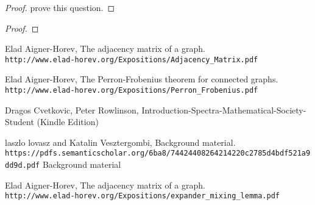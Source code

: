 \documentclass[a4paper, 11pt, oneside]{article}
\newenvironment{problem}[1]
  {\renewcommand\theinnercustomprob{#1}\innercustomprob}
  {\endinnercustomprob}
\begin{document}
\begin{proof}
 \cite[Lemma 8]{expander} prove this question.
\end{proof}		

 
 \begin{problem}{6}\label{problem6}
\end{problem}

\begin{proof}

\end{proof}		

 

\begin{thebibliography}{9} 
Elad Aigner-Horev,
The adjacency matrix of a graph.
\\\texttt{http://www.elad-horev.org/Expositions/Adjacency\_Matrix.pdf}

Elad Aigner-Horev,
The Perron-Frobenius theorem for connected graphs.
\\\texttt{http://www.elad-horev.org/Expositions/Perron\_Frobenius.pdf}

Dragos Cvetkovic, Peter Rowlinson,
Introduction-Spectra-Mathematical-Society-Student (Kindle Edition)

laszlo lovasz and Katalin Vesztergombi,
Background material.
\\\texttt{https://pdfs.semanticscholar.org/6ba8/74424408264214220c2785d4bdf521a9dd9d.pdf}
Background material

Elad Aigner-Horev,
The adjacency matrix of a graph.
\\\texttt{http://www.elad-horev.org/Expositions/expander\_mixing\_lemma.pdf}
\end{thebibliography}
\end{document}
